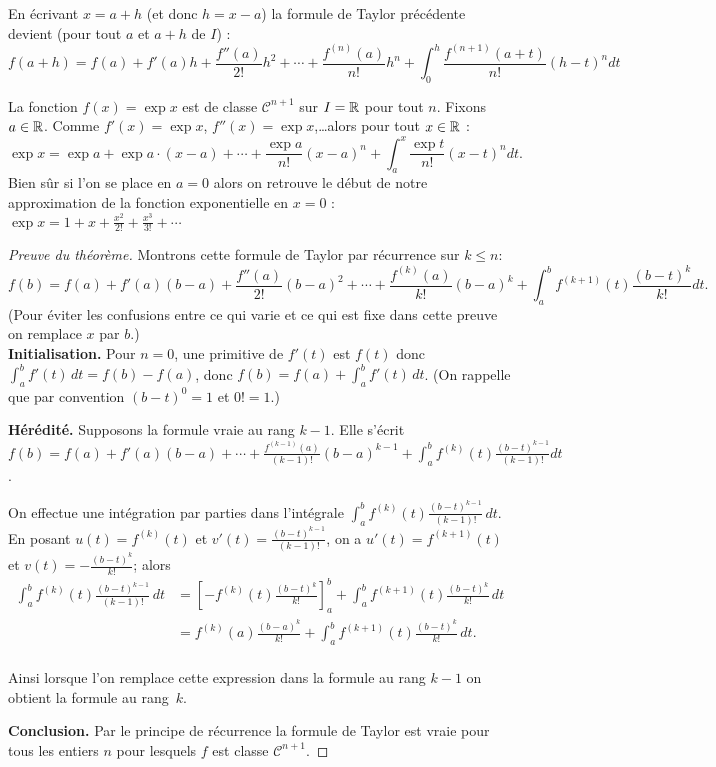 \documentclass[class=report,crop=false]{standalone}
\begin{document}
\begin{remarque*}
En écrivant $x=a+h$ (et donc $h=x-a$)
la formule de Taylor précédente devient (pour tout $a$ et $a+h$ de $I$) :
$$f(a+h)=f(a)+f'(a)h+\frac{f''(a)}{2!}h^2+\cdots
+\frac{f^{(n)}(a)}{n!}h^n+\int_0^{h} \frac{f^{(n+1)}(a+t)}{n!}(h-t)^ndt$$
\end{remarque*}

\begin{exemple}
La fonction $f(x)=\exp x$ est de classe $\mathcal{C}^{n+1}$ sur $I=\mathbb{R}$ pour tout $n$. Fixons $a\in\mathbb{R}$.
Comme $f'(x)=\exp x$, $f''(x)=\exp x$,\ldots alors pour tout $x\in\mathbb{R}$ :
$$\exp x=\exp a+\exp a \cdot (x-a)+\cdots+\frac{\exp a}{n!}(x-a)^n+\int_a^x\frac{\exp t}{n!}(x-t)^ndt.$$
Bien sûr si l'on se place en $a=0$ alors on retrouve le début de notre approximation de la fonction
exponentielle en $x=0$ : $\exp x=1+x+\frac{x^2}{2!}+\frac{x^3}{3!}+\cdots$
\end{exemple}



\begin{proof}[Preuve du théorème]
Montrons cette formule de Taylor par récurrence sur $k \le n$:
{\small
\[
f(b)=f(a)+f'(a)(b-a)+\frac{f''(a)}{2!}(b-a)^2+\cdots
+\frac{f^{(k)}(a)}{k!}(b-a)^k+\int_a^b f^{(k+1)}(t)\frac{(b-t)^k}{k!}dt.
\]}
(Pour éviter les confusions entre ce qui varie et ce qui est fixe dans cette
preuve on remplace $x$ par $b$.)
\\

\textbf{Initialisation.}
Pour $n=0$, une primitive de $f'(t)$ est $f(t)$ donc
$\int_a^b f'(t) \, dt=f(b)-f(a)$, donc
$f(b)=f(a)+\int_a^b f'(t) \, dt$.
(On rappelle que par convention $(b-t)^0=1$ et $0!=1$.)

\textbf{Hérédité.}
Supposons la formule vraie au rang $k-1$. Elle s'écrit
$f(b)=f(a)+f'(a)(b-a)+\cdots
+\frac{f^{(k-1)}(a)}{(k-1)!}(b-a)^{k-1}
+\int_a^bf^{(k)}(t)\frac{(b-t)^{k-1}}{(k-1)!}dt$.

On effectue une intégration par parties dans l'intégrale
$\int_a^b f^{(k)}(t) \frac{(b-t)^{k-1}}{(k-1)!} \, dt$. En posant
$u(t)=f^{(k)}(t)$ et $v'(t) = \frac{(b-t)^{k-1}}{(k-1)!}$,
on a $u'(t)= f^{(k+1)}(t)$ et $v(t) = - \frac{(b-t)^{k}}{k!}$; alors
\begin{align*}
\int_a^b f^{(k)}(t) \frac{(b-t)^{k-1}}{(k-1)!} \, dt
  & = \left[-f^{(k)}(t)\frac{(b-t)^{k}}{k!}\right]_a^b + \int_a^b f^{(k+1)}(t) \frac{(b-t)^{k}}{k!} \, dt\\
  & = f^{(k)}(a)\frac{(b-a)^{k}}{k!} + \int_a^b f^{(k+1)}(t) \frac{(b-t)^{k}}{k!}\, dt . \\
\end{align*}

Ainsi lorsque l'on remplace cette expression dans la formule au rang $k-1$ on obtient la formule au rang~$k$.

\textbf{Conclusion.} Par le principe de récurrence la formule de Taylor est vraie
pour tous les entiers $n$ pour lesquels $f$ est classe $\mathcal{C}^{n+1}$.
\end{proof}
\end{document}
